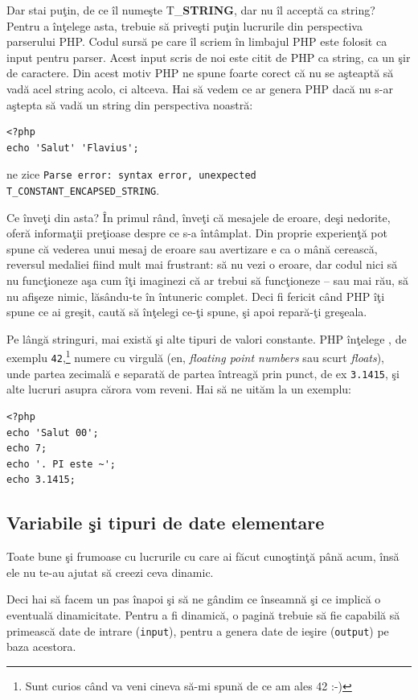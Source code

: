 Dar stai puţin, de ce îl numeşte {\glqq}T\_\textbf{STRING}{\grqq}, dar nu îl acceptă ca string?
Pentru a înţelege asta, trebuie să priveşti puţin lucrurile din perspectiva parserului
PHP. Codul sursă pe care îl scriem în limbajul PHP este folosit ca input pentru
parser. Acest input scris de noi este citit de PHP ca string, ca un şir de caractere.
Din acest motiv PHP ne spune foarte corect că nu se aşteaptă să vadă acel string acolo,
ci altceva.
Hai să vedem ce ar genera PHP dacă nu s-ar aştepta să vadă un string
din perspectiva noastră:
\begin{lstlisting}
<?php
echo 'Salut' 'Flavius';
\end{lstlisting}
ne zice \texttt{Parse error: syntax error, unexpected T\_CONSTANT\_ENCAPSED\_STRING}.

Ce înveţi din asta? În primul rând, înveţi că mesajele de eroare, deşi nedorite,
oferă informaţii preţioase despre ce s-a întâmplat. Din proprie experienţă
pot spune că vederea unui mesaj de eroare sau avertizare e ca o mână cerească,
reversul medaliei fiind mult mai frustrant: să nu vezi o eroare, dar codul
nici să nu funcţioneze aşa cum îţi imaginezi că ar trebui să funcţioneze -- sau
mai rău, să nu afişeze nimic, lăsându-te în întuneric complet. Deci fi fericit
când PHP îţi spune ce ai greşit, caută să înţelegi ce-ţi spune, şi apoi
repară-ţi greşeala.

Pe lângă stringuri, mai există şi alte tipuri de valori constante. PHP înţelege
, de exemplu \texttt{42},\footnote{Sunt curios
când va veni cineva să-mi spună de ce am ales 42 :-)}
numere cu virgulă (en, \textsl{floating point numbers} sau scurt \textsl{floats}),
unde partea zecimală
e separată de partea întreagă prin punct, de ex \texttt{3.1415}, şi alte lucruri
asupra cărora vom reveni. Hai să ne uităm la un exemplu:
\begin{lstlisting}
<?php
echo 'Salut 00';
echo 7;
echo '. PI este ~';
echo 3.1415;
\end{lstlisting}

\subsection{Variabile şi tipuri de date elementare}
Toate bune şi frumoase cu lucrurile cu care ai făcut cunoştinţă
până acum, însă ele nu te-au ajutat să creezi ceva dinamic.

Deci hai să facem un pas înapoi şi să ne gândim ce înseamnă şi
ce implică o eventuală dinamicitate. Pentru a fi dinamică, o
pagină trebuie să fie capabilă să primească date de intrare (\texttt{input}),
pentru a genera date de ieşire (\texttt{output}) pe baza acestora.

